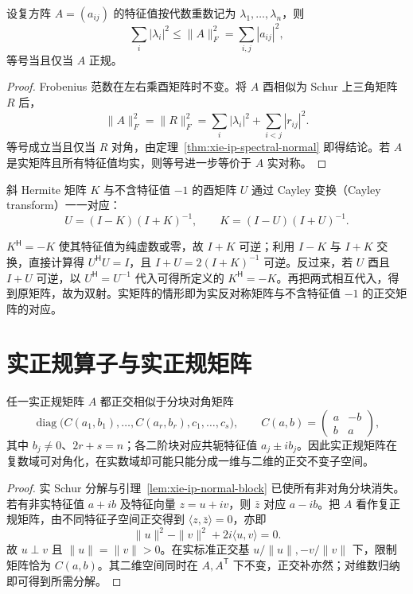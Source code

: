 \begin{proposition}
设复方阵 $A=(a_{ij})$ 的特征值按代数重数记为 $\lambda_1,\ldots,\lambda_n$，则
\begin{equation}
\label{eq:xie-ip-frobenius-spectrum}
\sum_i|\lambda_i|^2\leq\|A\|_F^2=\sum_{i,j}|a_{ij}|^2,
\end{equation}
等号当且仅当 $A$ 正规。
\end{proposition}
\begin{proof}
Frobenius 范数在左右乘酉矩阵时不变。将 $A$ 酉相似为 Schur 上三角矩阵 $R$ 后，
\[
\|A\|_F^2=\|R\|_F^2
=\sum_i|\lambda_i|^2+\sum_{i<j}|r_{ij}|^2.
\]
等号成立当且仅当 $R$ 对角，由定理~\ref{thm:xie-ip-spectral-normal} 即得结论。若 $A$ 是实矩阵且所有特征值均实，则等号进一步等价于 $A$ 实对称。
\end{proof}

\begin{example}
斜 Hermite 矩阵 $K$ 与不含特征值 $-1$ 的酉矩阵 $U$ 通过 Cayley 变换（Cayley transform）一一对应：
\[
U=(I-K)(I+K)^{-1},\qquad K=(I-U)(I+U)^{-1}.
\]
\end{example}
\begin{solve}
$K^{\mathsf H}=-K$ 使其特征值为纯虚数或零，故 $I+K$ 可逆；利用 $I-K$ 与 $I+K$ 交换，直接计算得 $U^{\mathsf H}U=I$，且 $I+U=2(I+K)^{-1}$ 可逆。反过来，若 $U$ 酉且 $I+U$ 可逆，以 $U^{\mathsf H}=U^{-1}$ 代入可得所定义的 $K^{\mathsf H}=-K$。再把两式相互代入，得到原矩阵，故为双射。实矩阵的情形即为实反对称矩阵与不含特征值 $-1$ 的正交矩阵的对应。
\end{solve}

\section{实正规算子与实正规矩阵}
\label{sec:xie-ip-real-normal}

\begin{theorem}
\label{thm:xie-ip-real-normal}
任一实正规矩阵 $A$ 都正交相似于分块对角矩阵
\begin{equation}
\label{eq:xie-ip-real-normal-form}
\operatorname{diag}\bigl(C(a_1,b_1),\ldots,C(a_r,b_r),c_1,\ldots,c_s\bigr),
\qquad C(a,b)=\begin{pmatrix}a&-b\\b&a\end{pmatrix},
\end{equation}
其中 $b_j\ne0$、$2r+s=n$；各二阶块对应共轭特征值 $a_j\pm ib_j$。因此实正规矩阵在复数域可对角化，在实数域却可能只能分成一维与二维的正交不变子空间。
\end{theorem}
\begin{proof}
实 Schur 分解与引理~\ref{lem:xie-ip-normal-block} 已使所有非对角分块消失。若有非实特征值 $a+ib$ 及特征向量 $z=u+iv$，则 $\bar z$ 对应 $a-ib$。把 $A$ 看作复正规矩阵，由不同特征子空间正交得到 $\langle z,\bar z\rangle=0$，亦即
\[
\|u\|^2-\|v\|^2+2i\langle u,v\rangle=0.
\]
故 $u\perp v$ 且 $\|u\|=\|v\|>0$。在实标准正交基 $u/\|u\|,-v/\|v\|$ 下，限制矩阵恰为 $C(a,b)$。其二维空间同时在 $A,A^{\mathsf T}$ 下不变，正交补亦然；对维数归纳即可得到所需分解。
\end{proof}


